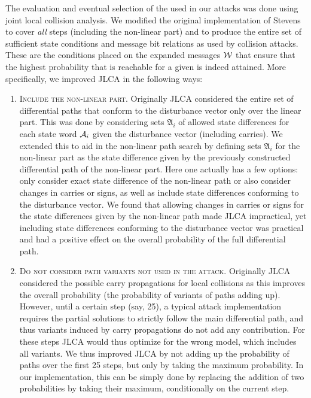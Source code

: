 The evaluation and eventual selection of the \dvs used in our attacks was done using joint local collision analysis. We modified the original implementation of Stevens~\cite{DBLP:conf/eurocrypt/Stevens13}
to cover \emph{all} steps (including the non-linear part) and to produce the entire set of sufficient state conditions and message bit relations as used by collision attacks. These are
the conditions placed on the expanded messages $\mathcal{W}$ that ensure that the highest probability that is reachable for a given \dv is indeed attained.
More specifically, we improved JLCA in the following ways:
\begin{enumerate}
\item \textsc{Include the non-linear part.} Originally JLCA considered the entire set of differential paths that conform to the disturbance vector only
over the linear part. 
This was done by considering sets $\mathfrak{A}_i$ of allowed state differences for each state word $\mathcal{A}_i$ given the disturbance vector (including carries).
We extended this to aid in the non-linear path search by defining sets $\mathfrak{A}_i$ for the non-linear part as the state difference given by the previously constructed differential path of the non-linear part.
Here one actually has a few options: only consider exact state difference of the non-linear path or also consider changes in carries or signs, as well as include state differences conforming to the disturbance vector.
We found that allowing changes in carries or signs for the state differences given by the non-linear path made JLCA impractical,
yet including state differences conforming to the disturbance vector was practical and had a positive effect on the overall probability of the full differential path.

\item \textsc{Do not consider path variants not used in the attack.} Originally JLCA considered the possible carry propagations for local collisions  as this improves the overall probability (the probability of variants of paths adding up). 
However, until a certain step (say, 25), a typical attack implementation requires the partial solutions to strictly follow the main differential path, and thus variants induced by carry propagations do not add any contribution.
For these steps JLCA would thus optimize for the wrong model, which includes all variants.
We thus improved JLCA by not adding up the probability of paths over the first 25 steps, but only by taking the maximum probability. 
In our implementation, this can be simply done by replacing the addition of two probabilities by taking their maximum, conditionally on the current \shaone step.


\end{enumerate}
